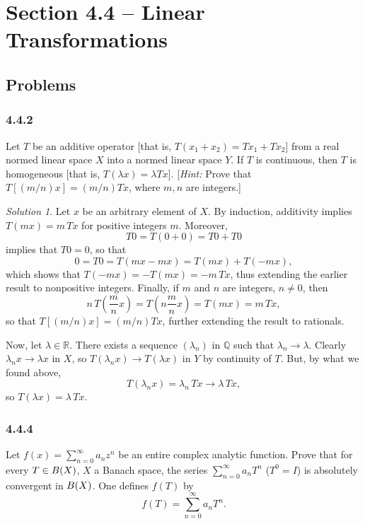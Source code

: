 \documentclass{report}
\newcommand{\bb}[1]{\mathbb{#1}}
\let\sc\relax
\newcommand{\sc}[1]{\mathscr{#1}}
\theoremstyle{remark}
\newtheorem*{solution}{Solution}
\begin{document}
\section*{Section 4.4 -- Linear Transformations}

\subsection*{Problems}

\subsubsection*{4.4.2}
Let $T$ be an additive operator [that is, $T(x_1 + x_2) = Tx_1 + Tx_2$] from a real normed linear space $X$ into a normed linear space $Y$. If $T$ is continuous, then $T$ is homogeneous [that is, $T(\lambda x) = \lambda Tx$]. [\emph{Hint:} Prove that $T[(m/n)x] = (m/n)Tx$, where $m,n$ are integers.]

\begin{solution}
  Let $x$ be an arbitrary element of $X$. By induction, additivity implies $T(mx) = m \, Tx$ for positive integers $m$. Moreover,
  \begin{equation*}
    T0 = T(0 + 0) = T0 + T0
  \end{equation*}
  implies that $T0 = 0$, so that
  \begin{equation*}
    0 = T0 = T(mx - mx) = T(mx) + T(-mx),
  \end{equation*}
  which shows that $T(-mx) = -T(mx) = -m \, Tx$, thus extending the earlier result to nonpositive integers. Finally, if $m$ and $n$ are integers, $n \ne 0$, then
  \begin{equation*}
    n \, T \left( \frac{m}{n} x \right) = T \left( n \frac{m}{n} x \right) = T(m x) = m \, Tx,
  \end{equation*}
  so that $T[(m/n)x] = (m/n) Tx$, further extending the result to rationals.

  Now, let $\lambda \in \bb R$. There exists a sequence $(\lambda_n)$ in $\bb Q$ such that $\lambda_n \to \lambda$. Clearly $\lambda_n x \to \lambda x$ in $X$, so $T(\lambda_n x) \to T(\lambda x)$ in $Y$ by continuity of $T$. But, by what we found above,
  \begin{equation*}
    T(\lambda_n x) = \lambda_n \, Tx \to \lambda \, Tx,
  \end{equation*}
  so $T(\lambda x) = \lambda \, Tx$.
\end{solution}


\subsubsection*{4.4.4}
Let $f(x) = \sum_{n=0}^\infty a_n z^n$ be an entire complex analytic function. Prove that for every $T \in \sc B(X)$, $X$ a Banach space, the series $\sum_{n=0}^\infty a_n T^n$ ($T^0 = I$) is absolutely convergent in $\sc B(X)$. One defines $f(T)$ by
\begin{equation*}
  f(T) = \sum_{n=0}^\infty a_n T^n.
\end{equation*}
\end{document}
